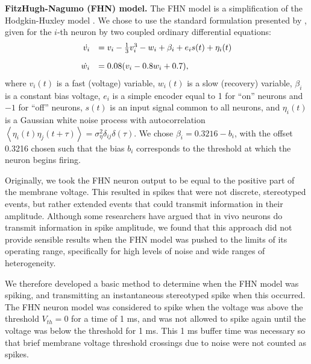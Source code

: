 \documentclass[12pt]{article}
\begin{document}
\textbf{FitzHugh-Nagumo (FHN) model.} The FHN model is a simplification of the Hodgkin-Huxley model \citep{FitzHugh1961}. We chose to use the standard formulation presented by \cite{Izhikevich2006}, given for the $i$-th neuron by two coupled ordinary differential equations:
\begin{equation}
  \begin{array}{rl}
    \dot{v_i} & = v_i - \frac{1}{3}v_i^3 - w_i + \beta_i + e_i s(t) + \eta_i(t) \vspace{1em}\\
    \dot{w_i} & = 0.08(v_i - 0.8w_i + 0.7),
  \end{array}
  \label{eqn:fhn}
\end{equation}
where $v_i(t)$ is a fast (voltage) variable, $w_i(t)$ is a slow (recovery) variable, $\beta_i$ is a constant bias voltage, $e_i$ is a simple encoder equal to 1 for ``on'' neurons and $-1$ for ``off'' neurons, $s(t)$ is an input signal common to all neurons, and $\eta_i(t)$ is a Gaussian white noise process with autocorrelation $\left<\eta_i(t)\eta_j(t + \tau)\right> = \sigma_\eta^2 \delta_{ij}\delta(\tau)$. We chose $\beta_i = 0.3216 - b_i$, with the offset 0.3216 chosen such that the bias $b_i$ corresponds to the threshold at which the neuron begins firing.

Originally, we took the FHN neuron output to be equal to the positive part of the membrane voltage.
This resulted in spikes that were not discrete, stereotyped events,
but rather extended events that could transmit information in their amplitude.
Although some researchers have argued that in vivo neurons do transmit information in spike amplitude,
we found that this approach did not provide sensible results when the FHN model
was pushed to the limits of its operating range,
specifically for high levels of noise and wide ranges of heterogeneity.

We therefore developed a basic method to determine when the FHN model was spiking,
and transmitting an instantaneous stereotyped spike when this occurred.
The FHN neuron model was considered to spike
when the voltage was above the threshold $V_{th} = 0$ for a time of 1 ms,
and was not allowed to spike again until the voltage was below the threshold for 1 ms.
This 1 ms buffer time was necessary so that brief membrane voltage threshold crossings
due to noise were not counted as spikes.
\end{document}
